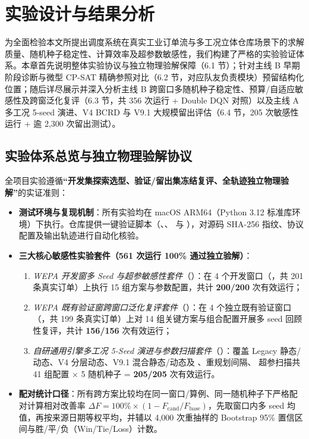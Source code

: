 \section{实验设计与结果分析}
\label{sec:experiments}

为全面检验本文所提出调度系统在真实工业订单流与多工况立体仓库场景下的求解质量、随机种子稳定性、计算效率及超参数敏感性，我们构建了严格的实验验证体系。本章首先说明整体实验协议与独立物理验解保障（6.1 节）；针对主线 B 早期阶段诊断与微型 CP-SAT 精确参照对比（6.2 节，对应队友负责模块）预留结构化位置；随后详尽展示并深入分析主线 B 跨窗口多随机种子稳定性、预算/自适应敏感性及跨窗泛化复评（6.3 节，共 356 次运行 + Double DQN 对照）以及主线 A 多工况 5-seed 演进、V4 BCRD 与 V9.1 大规模留出评估（6.4 节，205 次敏感性运行 + 逾 2,300 次留出测试）。

\subsection{实验体系总览与独立物理验解协议}

全项目实验遵循\textbf{“开发集探索选型、验证/留出集冻结复评、全轨迹独立物理验解”}的实证准则：

\begin{itemize}
  \item \textbf{测试环境与复现机制}：所有实验均在 macOS ARM64（Python 3.12 标准库环境）下执行。仓库提供一键验证脚本（、、 与 ），对源码 SHA-256 指纹、协议配置及输出轨迹进行自动化核验。
  \item \textbf{三大核心敏感性实验套件（561 次运行 100\% 通过独立验解）}：
  \begin{enumerate}
    \item \emph{WEPA 开发窗多 Seed 与超参敏感性套件}（）：在 4 个开发窗口（，共 201 条真实订单）上执行 15 组方案与参数配置，共计 \textbf{200/200} 次有效运行；
    \item \emph{WEPA 既有验证窗跨窗口泛化复评套件}（）：在 4 个独立既有验证窗口（，共 199 条真实订单）上对 14 组关键方案与组合配置开展多 seed 回顾性复评，共计 \textbf{156/156} 次有效运行；
    \item \emph{自研通用引擎多工况 5-Seed 演进与参数扫描套件}（）：覆盖 Legacy 静态/动态、V4 分层动态、V9.1 混合静态/动态及 、重规划间隔、 超参扫描共 41 组配置 $\times$ 5 随机种子 = \textbf{205/205} 次有效运行。
  \end{enumerate}
  \item \textbf{配对统计口径}：所有跨方案比较均在同一窗口/算例、同一随机种子下严格配对计算相对改善率 $\Delta F = 100\% \times (1 - F_{\text{cand}}/F_{\text{base}})$，先取窗口内多 seed 均值，再按来源日期等权平均，并辅以 4,000 次重抽样的 Bootstrap 95\% 置信区间与胜/平/负（Win/Tie/Loss）计数。
\end{itemize}

